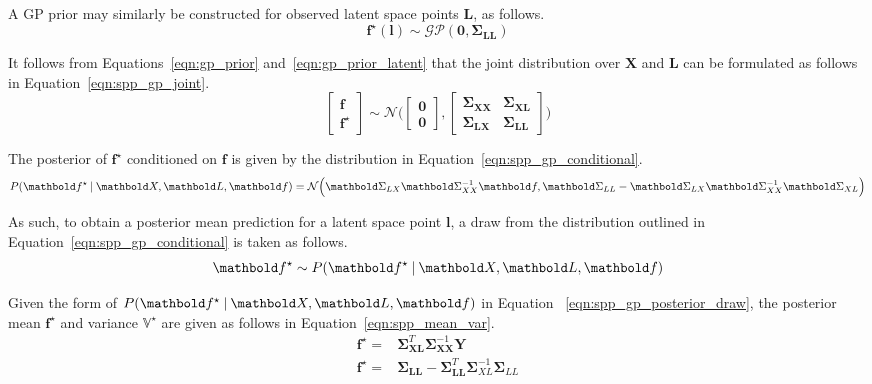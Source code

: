 A GP prior may similarly be constructed for observed latent 
space points \( \bm{L} \), as follows.
\begin{equation}
  \label{eqn:gp_prior_latent}
  \bm{f}^{\star}(\bm{l}) \sim \mathcal{GP}(\bm{0}, \bm{\Sigma}_{\bm{LL}})
\end{equation}

It follows from Equations~\ref{eqn:gp_prior} and~\ref{eqn:gp_prior_latent} that 
the joint distribution over \( \bm{X} \) and \( \bm{L} \) can be formulated as 
follows in Equation~\ref{eqn:spp_gp_joint}.
\begin{equation}
  \label{eqn:spp_gp_joint}
  \begin{bmatrix}
    \bm{f}\\
    \bm{f}^{\star}
  \end{bmatrix}
  \sim \mathcal{N} \Bigg(
    \begin{bmatrix}
      \bm{0}\\
      \bm{0}
    \end{bmatrix},
    \begin{bmatrix}
      \bm{\Sigma}_{\bm{XX}} & \bm{\Sigma}_{\bm{XL}}\\
      \bm{\Sigma}_{\bm{LX}} & \bm{\Sigma}_{\bm{LL}}
    \end{bmatrix}
  \Bigg)
\end{equation}

The posterior of \( \bm{f}^{\star} \) conditioned on \( \bm{f} \) is given by
the distribution in Equation~\ref{eqn:spp_gp_conditional}.
\begin{equation}
  \label{eqn:spp_gp_conditional}
  P(\bm{f}^{\star} \given \bm{X}, \bm{L}, \bm{f}) = 
  \mathcal{N} \Big(
    \bm{\Sigma}_{LX} \bm{\Sigma}_{XX}^{-1} \bm{f}, 
    \bm{\Sigma}_{LL} - \bm{\Sigma}_{LX} \bm{\Sigma}_{XX}^{-1} \bm{\Sigma}_{XL}
  \Big) 
\end{equation}

As such, to obtain a posterior mean prediction for a latent space point \( \bm{l} \), 
a draw from the distribution outlined in Equation~\ref{eqn:spp_gp_conditional} is 
taken as follows.
\begin{equation}
  \label{eqn:spp_gp_posterior_draw}
  \bm{f}^{\star} \sim P(\bm{f}^{\star} \given \bm{X}, \bm{L}, \bm{f})
\end{equation}

Given the form of \( P(\bm{f}^{\star} \given \bm{X}, \bm{L}, \bm{f}) \) in Equation
~\ref{eqn:spp_gp_posterior_draw}, the posterior mean \( \bm{f}^{\star} \) and variance
\( \mathbb{V}^{\star} \) are given as follows in Equation~\ref{eqn:spp_mean_var}.
\begin{align}
  \label{eqn:spp_mean_var}
  \bm{f}^{\star} ={}& 
  \bm{\Sigma}_{\bm{XL}}^{T} \bm{\Sigma}_{\bm{XX}}^{-1} \bm{Y}\\
  \mathbb{\bm{f}^{\star}} ={}&
  \bm{\Sigma}_{\bm{LL}} - \bm{\Sigma}_{\bm{LL}}^{T} \bm{\Sigma}_{XL}^{-1} \bm{\Sigma}_{LL}
\end{align}

